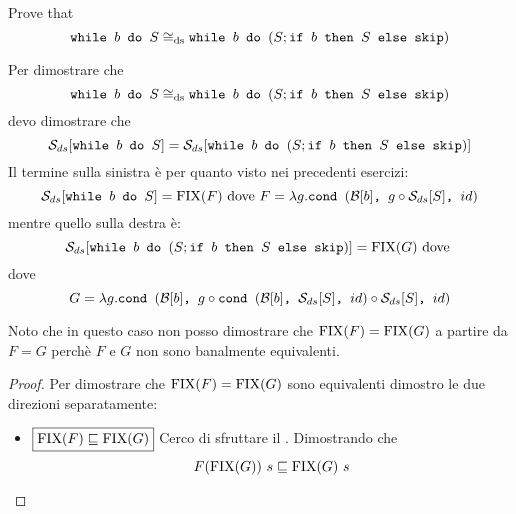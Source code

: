 {Prove that
$$
	\wbS{b}{S} \eqDS \wbS{b}{(S; \ifABC{b}{S}{\skipForFriends})}
$$
}
{
Per dimostrare che 
$$
	\wbS{b}{S} \eqDS \wbS{b}{(S; \ifABC{b}{S}{\skipForFriends})}
$$	
devo dimostrare che
$$
\dsCtxt{\wbS{b}{S}} = \dsCtxt{\wbS{b}{(S; \ifABC{b}{S}{\skipForFriends})}}
$$
Il termine sulla sinistra è per quanto visto nei precedenti esercizi:
$$
\dsCtxt{\wbS{b}{S}} = \fixp{F} \text{ dove } F = \lambda g. \cond{b}{g \circ \dsCtxt{S}}{id}
$$
mentre quello sulla destra è:
$$
\dsCtxt{\wbS{b}{(S; \ifABC{b}{S}{\skipForFriends})}} = \fixp{G} \text{ dove } 
$$
dove 
$$
G = \lambda g. \cond{b}{g \circ \cond{b}{\dsCtxt{S}}{id} \circ \dsCtxt{S}}{id} 
$$

Noto che in questo caso non posso dimostrare che $\fixp{F} = \fixp{G}$ a partire da $F = G$ perchè
$F$ e $G$ non sono banalmente equivalenti.

\begin{proof}
Per dimostrare che $\fixp{F} = \fixp{G}$ sono equivalenti dimostro le due direzioni separatamente:
\begin{itemize}
  \item $\boxed{\fixp{F} \sqsubseteq \fixp{G}}$
  Cerco di sfruttare il \FPIL. Dimostrando che
  $$
  F(\fixp{G})\ s \sqsubseteq \fixp{G}\ s
  $$


\end{itemize}
\end{proof}}
